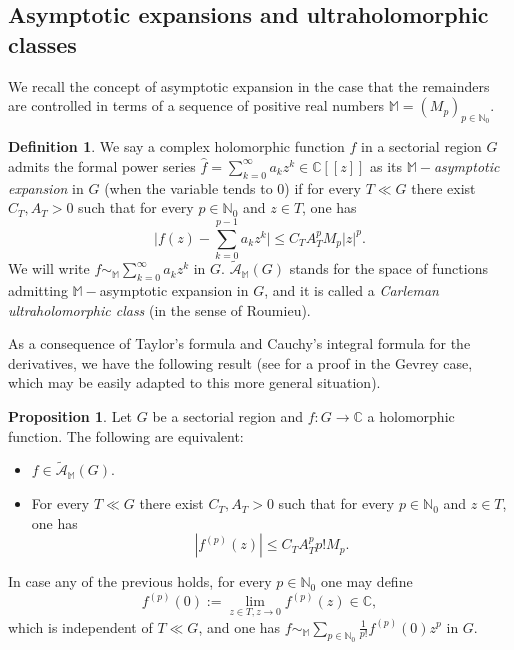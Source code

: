 \documentclass[11pt,a4paper]{article}
\theoremstyle{definition}
\newtheorem{pro}[theo]{Proposition}
\newtheorem{defi}[theo]{Definition}
\newenvironment{prop}{\smallskip\begin{pro}}{\end{pro}\smallskip}
\def\N{\mathbb{N}}
\def\C{\mathbb{C}}      %
\def\M{\mathbb{M}}
\def\bM{\mathbb{M}}%
\begin{document}
\subsection{Asymptotic expansions and ultraholomorphic classes}\label{subsectCarlemanclasses}



We recall the concept of asymptotic expansion in the case that the remainders are controlled in terms of a sequence of positive real numbers $\M=(M_p)_{p\in\N_0}$.

\begin{defi}
We say a complex holomorphic function $f$ in a sectorial region $G$ admits the formal power series $\hat{f}=\sum_{k=0}^{\infty}a_{k}z^{k}\in\C[[z]]$ as
its $\bM-$\emph{asymptotic expansion} in $G$ (when the variable tends to 0) if for every $T\ll G$ there
exist $C_T,A_T>0$ such that for every $p\in\N_0$ and $z\in T$, one has
\begin{equation*}\Big|f(z)-\sum_{k=0}^{p-1}a_kz^k \Big|\le C_TA_T^pM_{p}|z|^p.%
\end{equation*}
We will write $f\sim_{\bM}\sum_{k=0}^{\infty}a_kz^k$ in $G$. $\tilde{\mathcal{A}}_{\M}(G)$ stands for the space of
functions admitting $\bM-$asymptotic expansion in $G$, and it is called a \emph{Carleman ultraholomorphic class} (in the sense of Roumieu).
\end{defi}



As a consequence of Taylor's formula and Cauchy's integral formula for the derivatives, we have the following result (see \cite{Balserutx} for a proof in the Gevrey case, which may be easily adapted to this more general situation).

\begin{prop}\label{propcotaderidesaasin}
Let $G$ be a sectorial region and $f\colon G\to\C$ a holomorphic function. The following are equivalent:
\begin{itemize}
\item[(i)] $f\in\tilde{\mathcal{A}}_{\M}(G)$.
\item[(ii)] For every $T\ll G$ there exist $C_T,A_T>0$ such that for every $p\in\N_0$ and $z\in T$, one has
    $$
    |f^{(p)}(z)|\le C_TA_T^p p!M_p.
    $$
    \end{itemize}
In case any of the previous holds, for every $p\in\N_{0}$ one may define
$$f^{(p)}(0):=\lim_{z\in T,z\to0 }f^{(p)}(z)\in\C,$$
which is independent of $T\ll G$, and one has $f\sim_{\M}\sum_{p\in\N_0}\frac{1}{p!}f^{(p)}(0)z^p$ in $G$.
\end{prop}
\end{document}
